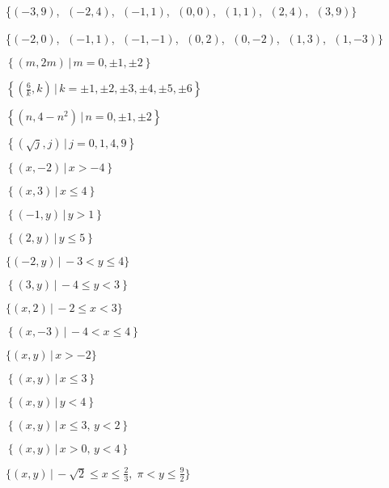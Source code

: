 \startexenum

\label{ExercisesforRelations}

\begin{exenum}


\item \{$(-3, 9)$, $\;(-2, 4)$, $\;(-1, 1)$, $\;(0, 0)$, $\;(1, 1)$, $\;(2, 4)$, $\;(3, 9)\}$ \label{relationfirst}
\item \{$(-2, 0)$, $\;(-1, 1)$, $\;(-1, -1)$, $\;(0, 2)$, $\;(0, -2)$, $\;(1, 3)$, $\;(1, -3)\}$
\item  $\left\{ \left(m, 2m \right) \, | \, m = 0, \pm 1, \pm 2 \right\}$
\item  $\left\{ \left(\frac{6}{k}, k \right) \, | \, k = \pm 1, \pm 2, \pm 3, \pm 4, \pm 5, \pm 6 \right\}$
\item  $\left\{ \left(n, 4 - n^2\right) \, | \, n = 0, \pm 1, \pm 2 \right\}$
\item  $\left\{ \left(\sqrt{j}, j \right) \, | \, j = 0, 1, 4, 9 \right\}$
\item  $\left\{ \left(x, -2 \right) \, | \, x > -4 \right\}$
\item  $\left\{ \left(x, 3 \right) \, | \, x \leq 4 \right\}$
\item  $\left\{ \left(-1, y \right) \, | \, y > 1 \right\}$
\item  $\left\{ \left(2, y \right) \, | \, y \leq 5 \right\}$
\item $\{ (-2, y) \, | \, -3 < y \leq 4\}$
\item  $\left\{ \left(3,y \right) \, | \, -4 \leq y < 3 \right\}$
\item $\{ (x, 2) \, | \, -2 \leq x < 3 \}$
\item  $\left\{ \left(x,-3 \right) \, | \, -4 < x \leq 4 \right\}$
\item $\{ (x, y) \, | \, x > -2 \}$
\item  $\left\{ \left(x,y \right) \, | \, x \leq 3 \right\}$
\item  $\left\{ \left(x,y \right) \, | \, y < 4 \right\}$
\item  $\left\{ \left(x,y \right) \, | \, x \leq 3, \, y < 2 \right\}$
\item  $\left\{ \left(x,y \right) \, | \, x > 0, \, y < 4 \right\}$
\item $\{ (x, y) \, | \, -\sqrt{2} \leq x \leq \frac{2}{3}, \; \pi < y \leq \frac{9}{2} \}$ \label{relationlast}


\end{exenum}
